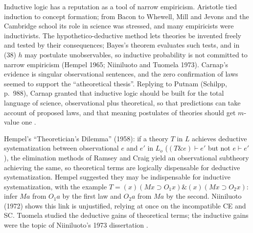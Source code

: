 Inductive logic has a reputation as a tool of narrow empiricism. Aristotle
tied induction to concept formation; from Bacon to Whewell, Mill and Jevons
and the Cambridge school its role in science was stressed, and many
empiricists were inductivists. The hypothetico-deductive method lets
theories be invented freely and tested by their consequences; Bayes's
theorem evaluates such tests, and in (38) \(h\) may postulate unobservables,
so inductive probability is not committed to narrow empiricism (Hempel
1965; Niiniluoto and Tuomela 1973). Carnap's
evidence is singular observational sentences, and the zero confirmation
of laws seemed to support the ``atheoretical thesis''. Replying to Putnam
(Schilpp, p.~988), Carnap granted that inductive logic should be built for
the total language of science, observational plus theoretical, so that
predictions can take account of proposed laws, and that meaning
postulates of theories should get \(m\)-value one
\cite[pp.~337--338]{Niiniluoto2011HintikkaProgramReading}.

Hempel's ``Theoretician's Dilemma'' (1958): if a theory \(T\) in \(L\)
achieves deductive systematization between observational \(e\) and \(e'\)
in \(L_o\) (\((T\&e)\vdash e'\) but not \(e\vdash e'\)), the elimination
methods of Ramsey and Craig yield an observational subtheory achieving the
same, so theoretical terms are logically dispensable for deductive
systematization. Hempel suggested they may be indispensable for inductive
systematization, with the example
\(T=(x)(Mx\supset O_1x)\&(x)(Mx\supset O_2x)\): infer \(Ma\) from \(O_1a\)
by the first law and \(O_2a\) from \(Ma\) by the second. Niiniluoto (1972)
shows this link is unjustified, relying at once on the incompatible CE and
SC. Tuomela studied the deductive gains of theoretical terms; the
inductive gains were the topic of Niiniluoto's 1973 dissertation
\cite[pp.~338--339]{Niiniluoto2011HintikkaProgramReading}.

